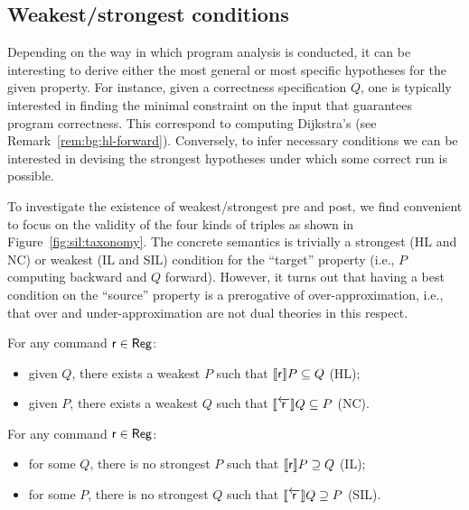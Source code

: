 \subsection{Weakest/strongest conditions}\label{sec:sil:extremal-conditions}
Depending on the way in which program analysis is conducted, it can be interesting to derive either the most general or most specific hypotheses for the given property.
For instance, given a correctness specification $Q$, one is typically interested in finding the minimal constraint on the input that guarantees program correctness. This correspond to computing Dijkstra's \wlp{} (see Remark~\ref{rem:bg:hl-forward}).
Conversely, to infer necessary conditions we can be interested in devising the strongest hypotheses under which some correct run is possible.

To investigate the existence of weakest/strongest pre and post, we find convenient to focus on the validity of the four kinds of triples as shown in Figure~\ref{fig:sil:taxonomy}.
The concrete semantics is trivially a strongest (HL and NC) or weakest (IL and SIL) condition for the ``target'' property (i.e., $P$ computing backward and $Q$ forward).
However, it turns out that having a best condition on the ``source'' property is a prerogative of over-approximation, i.e., that over and under-approximation are not dual theories in this respect.
\begin{prop}\label{prop:sil:weakest-cond-existence}
	For any command $\mathsf{r}\in\mathsf{Reg}$:
	\begin{itemize}
		\item given $Q$, there exists a weakest $P$ such that $\llbracket\mathsf{r}\rrbracket P \subseteq Q$ (HL);
		\item given $P$, there exists a weakest $Q$ such that $\llbracket\overleftarrow{\mathsf{r}}\rrbracket Q \subseteq P$ (NC).
	\end{itemize}
\end{prop}

\begin{prop}\label{prop:sil:strongest-cond-non-existence}
	For any command $\mathsf{r}\in\mathsf{Reg}$:
	\begin{itemize}
		\item for some $Q$, there is no strongest $P$ such that $\llbracket\mathsf{r}\rrbracket P \supseteq Q$ (IL);
		\item for some $P$, there is no strongest $Q$ such that $\llbracket\overleftarrow{\mathsf{r}}\rrbracket Q \supseteq P$ (SIL).
	\end{itemize}
\end{prop}

